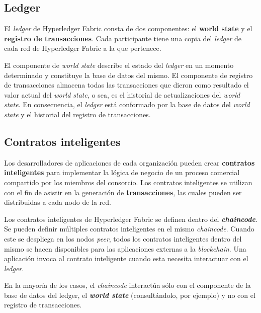 
\subsection{Ledger}

El \textit{ledger} de Hyperledger Fabric consta de dos componentes: el \textbf{world state} y el \textbf{registro de transacciones}. Cada participante tiene una copia del \textit{ledger} de cada red de Hyperledger Fabric a la que pertenece.

El componente de \textit{world state} describe el estado del \textit{ledger} en un momento determinado y constituye la base de datos del mismo. El componente de registro de transacciones almacena todas las transacciones que dieron como resultado el valor actual del \textit{world state}, o sea, es el historial de actualizaciones del \textit{world state}. En consecuencia, el \textit{ledger} está conformado por la base de datos del \textit{world state} y el historial del registro de transacciones.

\subsection{Contratos inteligentes}

Los desarrolladores de aplicaciones de cada organización pueden crear \textbf{contratos inteligentes }para implementar la lógica de negocio de un proceso comercial compartido por los miembros del consorcio. Los contratos inteligentes se utilizan con el fin de asistir en la generación de \textbf{transacciones}, las cuales pueden ser distribuidas a cada nodo de la red.

Los contratos inteligentes de Hyperledger Fabric se definen dentro del \textbf{\textit{chaincode}}. Se pueden definir múltiples contratos inteligentes en el mismo \textit{chaincode}. Cuando este se despliega en los nodos \textit{peer}, todos los contratos inteligentes dentro del mismo se hacen disponibles para las aplicaciones externas a la \textit{blockchain}. Una aplicación  invoca al contrato inteligente cuando esta necesita interactuar con el \textit{ledger}. 

En la mayoría de los casos, el \textit{chaincode} interactúa sólo con el componente de la base de datos del ledger, el \textbf{\textit{world state}} (consultándolo, por ejemplo) y no con el registro de transacciones.

